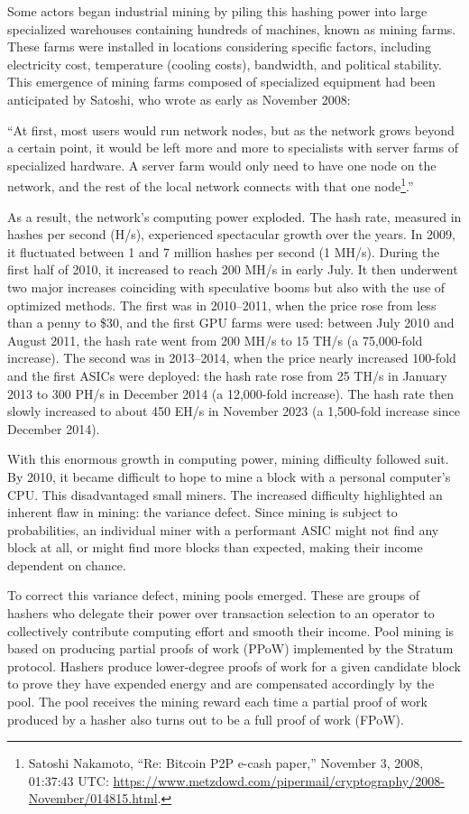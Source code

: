 \documentclass[
  a5paper,
  smalldemyvopaper,10pt,twoside,onecolumn,openright,extrafontsizes,hidelinks]{memoir}
\begin{document}
Some actors began industrial mining by piling this hashing power into
large specialized warehouses containing hundreds of machines, known as
mining farms. These farms were installed in locations considering
specific factors, including electricity cost, temperature (cooling
costs), bandwidth, and political stability. This emergence of mining
farms composed of specialized equipment had been anticipated by Satoshi,
who wrote as early as November 2008:

``At first, most users would run network nodes, but as the network grows
beyond a certain point, it would be left more and more to specialists
with server farms of specialized hardware. A server farm would only need
to have one node on the network, and the rest of the local network
connects with that one node\footnote{Satoshi Nakamoto, ``Re: Bitcoin P2P
  e-cash paper,'' November 3, 2008, 01:37:43 UTC:
  \url{https://www.metzdowd.com/pipermail/cryptography/2008-November/014815.html}.}.''

As a result, the network's computing power exploded. The hash rate,
measured in hashes per second (H/s), experienced spectacular growth over
the years. In 2009, it fluctuated between 1 and 7 million hashes per
second (1 MH/s). During the first half of 2010, it increased to reach
200 MH/s in early July. It then underwent two major increases coinciding
with speculative booms but also with the use of optimized methods. The
first was in 2010--2011, when the price rose from less than a penny to
\$30, and the first GPU farms were used: between July 2010 and August
2011, the hash rate went from 200 MH/s to 15 TH/s (a 75,000-fold
increase). The second was in 2013--2014, when the price nearly increased
100-fold and the first ASICs were deployed: the hash rate rose from 25
TH/s in January 2013 to 300 PH/s in December 2014 (a 12,000-fold
increase). The hash rate then slowly increased to about 450 EH/s in
November 2023 (a 1,500-fold increase since December 2014).

With this enormous growth in computing power, mining difficulty followed
suit. By 2010, it became difficult to hope to mine a block with a
personal computer's CPU. This disadvantaged small miners. The increased
difficulty highlighted an inherent flaw in mining: the variance defect.
Since mining is subject to probabilities, an individual miner with a
performant ASIC might not find any block at all, or might find more
blocks than expected, making their income dependent on chance.

To correct this variance defect, mining pools emerged. These are groups
of hashers who delegate their power over transaction selection to an
operator to collectively contribute computing effort and smooth their
income. Pool mining is based on producing partial proofs of work (PPoW)
implemented by the Stratum protocol. Hashers produce lower-degree proofs
of work for a given candidate block to prove they have expended energy
and are compensated accordingly by the pool. The pool receives the
mining reward each time a partial proof of work produced by a hasher
also turns out to be a full proof of work (FPoW).
\end{document}

